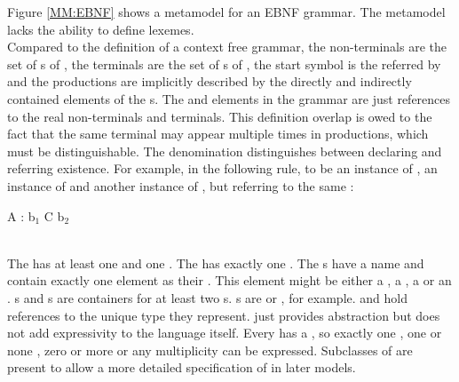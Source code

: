 Figure \ref{MM:EBNF} shows a metamodel for an EBNF grammar. The metamodel lacks the ability to define lexemes.  \\
Compared to the definition of a context free grammar, the non-terminals are the set of s of , the terminals are the set of s of , the start symbol is the  referred by  and the productions are implicitly described by the directly and indirectly contained elements of the s. The  and  elements in the grammar are just references to the real non-terminals and terminals. This definition overlap is owed to the fact that the same terminal may appear multiple times in productions, which must be distinguishable. The denomination distinguishes between declaring and referring existence. For example, in the following rule,  to be an instance of ,  an instance of  and  another instance of , but referring to the same :
\\\begin{code}
A : b$_1$ C b$_2$
\end{code}\\

The  has at least one  and one . The  has exactly one . The s have a name and contain exactly one element as their . This element might be either a , a , a  or an . s and s are containers for at least two s. s are  or , for example.  and  hold references to the unique type they represent.  just provides abstraction but does not add expressivity to the language itself. Every  has a , so exactly one , one or none , zero or more \code{+} or any multiplicity \code{*} can be expressed. Subclasses of  are present to allow a more detailed specification of  in later models.



